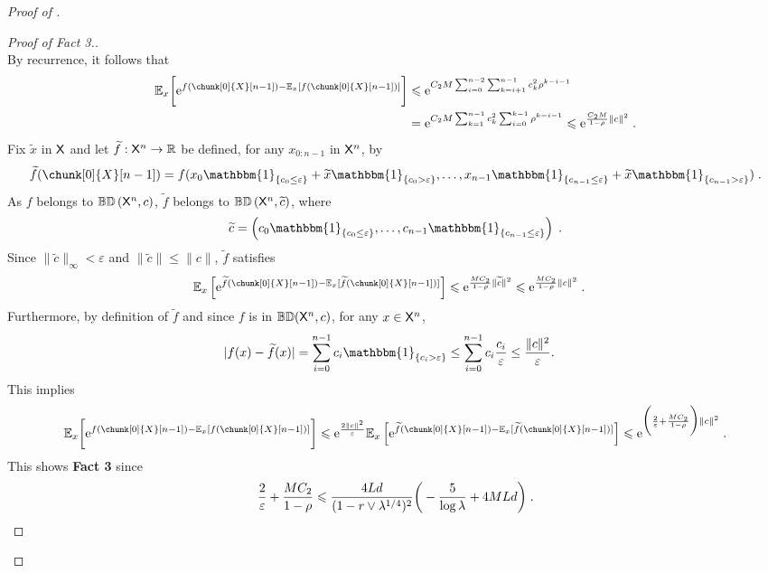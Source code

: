 \documentclass[leqno,11pt,a4paper]{article}
\begin{document}
\begin{proof}[Proof of ]
\begin{proof}[Proof of Fact 3.]
\[\]
By recurrence, it follows that
\begin{align*}
\Ebb_x\bigg[\rme^{f(\chunk[0]{X}[n-1])-\Ebb_x[f(\chunk[0]{X}[n-1])]}\bigg]&\leqslant \rme^{C_2M\sum_{i=0}^{n-2}\sum_{k=i+1}^{n-1}c_k^2\rho^{k-i-1}}\\
&=\rme^{C_2M\sum_{k=1}^{n-1}c_k^2\sum_{i=0}^{k-1}\rho^{k-i-1}}\leqslant \rme^{\frac{C_2M}{1-\rho}\|c\|^2} \eqsp.
\end{align*}
Fix $\tilde{x}$ in $\mathsf{X}$ and let $\widetilde{f} : \mathsf{X}^n \rightarrow \mathbb{R}$ be defined, for any $x_{0:n-1}$ in $\mathsf{X}^n$, by
\[
\tilde{f}(\chunk[0]{X}[n-1])
=
f(x_0\mathbbm{1}_{\{c_{0}\leq\varepsilon\}} + \tilde{x} \mathbbm{1}_{\{c_{0}>\varepsilon\}},\dots, x_{n-1}\mathbbm{1}_{\{c_{n-1}\leq\varepsilon\}} + \tilde{x} \mathbbm{1}_{\{c_{n-1}>\varepsilon\}})
\eqsp .
\]
As $f$ belongs to $\mathbb{BD}\left(\mathsf{X}^n,c\right)$, $\tilde{f}$ belongs to $ \mathbb{BD}\left(\mathsf{X}^n,\widetilde{c}\right)$, where
\[
\tilde{c}
=
\left( c_0\mathbbm{1}_{\{c_{0}\leq\varepsilon\}},\dots,c_{n-1}\mathbbm{1}_{\{c_{n-1}\leq\varepsilon\}}\right)
\eqsp .
\]
Since $\|\tilde{c}\|_{\infty} < \varepsilon$ and $\|\tilde{c}\|\leqslant \|c\|$, $\tilde{f}$ satisfies
\begin{align}\label{ineq:max-gamma-leq-varepsilon-ftilde}
\Ebb_{x}\left[\rme^{\tilde{f}(\chunk[0]{X}[n-1])-\Ebb_{x}[\tilde{f}(\chunk[0]{X}[n-1])]}\right]
& \leqslant
\rme^{\frac{MC_2}{1-\rho}
\| \tilde{c}\|^2} \leqslant
\rme^{\frac{MC_2}{1-\rho}
\| c\|^2}
\eqsp .
\end{align}
Furthermore, by definition of $\tilde{f}$ and since $f$ is in $\mathbb{BD}(\mathsf{X}^n,c)$, for any $x\in\mathsf{X}^n$,
\begin{align}\label{ineq:difference-f-tildef}
|f(x)-\tilde{f}(x)|
& =
\sum_{i=0}^{n-1} c_i \mathbbm{1}_{\{c_i>\varepsilon\}}
\leq
\sum_{i=0}^{n-1} c_i \frac{c_i}{\varepsilon}
\leq
\frac{\|c\|^2}{\varepsilon}.
\end{align}
This implies
\[
\Ebb_x\bigg[\rme^{f(\chunk[0]{X}[n-1])-\Ebb_x[f(\chunk[0]{X}[n-1])]}\bigg]\leqslant \rme^{\frac{2\|c\|^2}{\varepsilon}}\Ebb_{x}\left[\rme^{\tilde{f}(\chunk[0]{X}[n-1])-\Ebb_{x}[\tilde{f}(\chunk[0]{X}[n-1])]}\right]\leqslant \rme^{\bigg(\frac2{\varepsilon}+\frac{MC_2}{1-\rho}\bigg)
\| c\|^2}
\eqsp .
\]
This shows {\bf Fact 3} since
\[
\frac2{\varepsilon}+\frac{MC_2}{1-\rho}\leqslant \frac{4Ld}{(1-r\vee \lambda^{1/4})^2}\bigg(-\frac5{\log \lambda}+4MLd\bigg)\;.
\]
\end{proof}


\end{proof}
\end{document}
